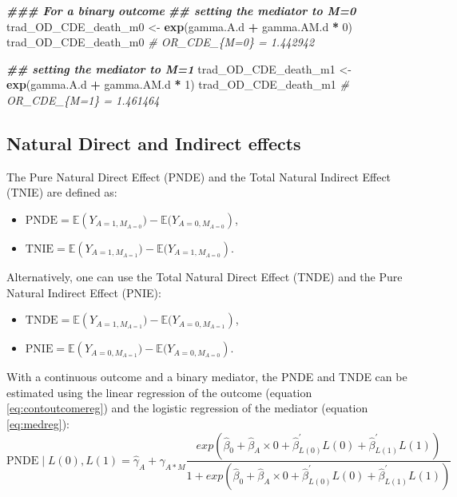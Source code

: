\documentclass[
]{book}
\newenvironment{Shaded}{\begin{snugshade}}{\end{snugshade}}
\newcommand{\CommentTok}[1]{\textcolor[rgb]{0.56,0.35,0.01}{\textit{#1}}}
\newcommand{\DecValTok}[1]{\textcolor[rgb]{0.00,0.00,0.81}{#1}}
\newcommand{\DocumentationTok}[1]{\textcolor[rgb]{0.56,0.35,0.01}{\textbf{\textit{#1}}}}
\newcommand{\FunctionTok}[1]{\textcolor[rgb]{0.13,0.29,0.53}{\textbf{#1}}}
\newcommand{\NormalTok}[1]{#1}
\newcommand{\OtherTok}[1]{\textcolor[rgb]{0.56,0.35,0.01}{#1}}
\newcommand{\SpecialCharTok}[1]{\textcolor[rgb]{0.81,0.36,0.00}{\textbf{#1}}}
\providecommand{\tightlist}{%
  \setlength{\itemsep}{0pt}\setlength{\parskip}{0pt}}
\begin{document}
\begin{Shaded}
\begin{Highlighting}[]
\DocumentationTok{\#\#\# For a binary outcome}
\DocumentationTok{\#\# setting the mediator to M=0}
\NormalTok{trad\_OD\_CDE\_death\_m0 }\OtherTok{\textless{}{-}} \FunctionTok{exp}\NormalTok{(gamma.A.d }\SpecialCharTok{+}\NormalTok{ gamma.AM.d }\SpecialCharTok{*} \DecValTok{0}\NormalTok{)}
\NormalTok{trad\_OD\_CDE\_death\_m0}
\CommentTok{\# OR\_CDE\_\{M=0\} = 1.442942 }

\DocumentationTok{\#\# setting the mediator to M=1}
\NormalTok{trad\_OD\_CDE\_death\_m1 }\OtherTok{\textless{}{-}} \FunctionTok{exp}\NormalTok{(gamma.A.d }\SpecialCharTok{+}\NormalTok{ gamma.AM.d }\SpecialCharTok{*} \DecValTok{1}\NormalTok{)}
\NormalTok{trad\_OD\_CDE\_death\_m1}
\CommentTok{\# OR\_CDE\_\{M=1\} = 1.461464 }
\end{Highlighting}
\end{Shaded}

\subsection{Natural Direct and Indirect effects}\label{trad2waynatural}

The Pure Natural Direct Effect (PNDE) and the Total Natural Indirect Effect (TNIE) are defined as:

\begin{itemize}
\tightlist
\item
  \(\text{PNDE} = \mathbb{E}\left(Y_{A=1,M_{A=0}}) - \mathbb{E}(Y_{A=0,M_{A=0}}\right)\),
\item
  \(\text{TNIE} = \mathbb{E}\left(Y_{A=1,M_{A=1}}) - \mathbb{E}(Y_{A=1,M_{A=0}}\right)\).
\end{itemize}

Alternatively, one can use the Total Natural Direct Effect (TNDE) and the Pure Natural Indirect Effect (PNIE):

\begin{itemize}
\tightlist
\item
  \(\text{TNDE} = \mathbb{E}\left(Y_{A=1,M_{A=1}}) - \mathbb{E}(Y_{A=0,M_{A=1}}\right)\),
\item
  \(\text{PNIE} = \mathbb{E}\left(Y_{A=0,M_{A=1}}) - \mathbb{E}(Y_{A=0,M_{A=0}}\right)\).
\end{itemize}

With a continuous outcome and a binary mediator, the PNDE and TNDE can be estimated using the linear regression of the outcome (equation \eqref{eq:contoutcomereg}) and the logistic regression of the mediator (equation \eqref{eq:medreg}):
\[\text{PNDE} \mid L(0), L(1) = \hat{\gamma}_A + \hat{\gamma}_{A \ast M} \frac{exp(\hat{\beta}_0 + \hat{\beta}_A \times 0 + \hat{\beta}_{L(0)}^\prime L(0) + \hat{\beta}_{L(1)}^\prime L(1))}{1 + exp(\hat{\beta}_0 + \hat{\beta}_A \times 0 + \hat{\beta}_{L(0)}^\prime L(0) + \hat{\beta}_{L(1)}^\prime L(1))}\]
\end{document}
